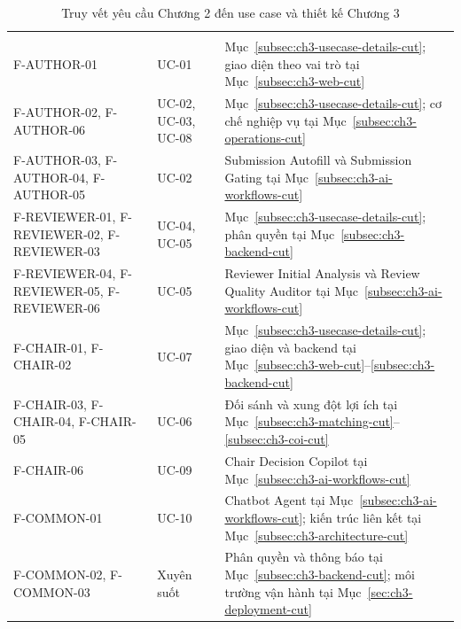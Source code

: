 \begingroup
\setlength{\tabcolsep}{2pt}
\begin{longtable}{|P{0.29\textwidth}|P{0.20\textwidth}|P{0.43\textwidth}|}
  \caption{Truy vết yêu cầu Chương 2 đến use case và thiết kế Chương 3}\label{tab:ch3-requirement-trace}\\
  \hline
   &  &  \\ \hline
  \endfirsthead
  \hline
   &  &  \\ \hline
  \endhead
  F-AUTHOR-01 & UC-01 & Mục~\ref{subsec:ch3-usecase-details-cut}; giao diện theo vai trò tại Mục~\ref{subsec:ch3-web-cut} \\ \hline
  F-AUTHOR-02, F-AUTHOR-06 & UC-02, UC-03, UC-08 & Mục~\ref{subsec:ch3-usecase-details-cut}; cơ chế nghiệp vụ tại Mục~\ref{subsec:ch3-operations-cut} \\ \hline
  F-AUTHOR-03, F-AUTHOR-04, F-AUTHOR-05 & UC-02 & Submission Autofill và Submission Gating tại Mục~\ref{subsec:ch3-ai-workflows-cut} \\ \hline
  F-REVIEWER-01, F-REVIEWER-02, F-REVIEWER-03 & UC-04, UC-05 & Mục~\ref{subsec:ch3-usecase-details-cut}; phân quyền tại Mục~\ref{subsec:ch3-backend-cut} \\ \hline
  F-REVIEWER-04, F-REVIEWER-05, F-REVIEWER-06 & UC-05 & Reviewer Initial Analysis và Review Quality Auditor tại Mục~\ref{subsec:ch3-ai-workflows-cut} \\ \hline
  F-CHAIR-01, F-CHAIR-02 & UC-07 & Mục~\ref{subsec:ch3-usecase-details-cut}; giao diện và backend tại Mục~\ref{subsec:ch3-web-cut}--\ref{subsec:ch3-backend-cut} \\ \hline
  F-CHAIR-03, F-CHAIR-04, F-CHAIR-05 & UC-06 & Đối sánh và xung đột lợi ích tại Mục~\ref{subsec:ch3-matching-cut}--\ref{subsec:ch3-coi-cut} \\ \hline
  F-CHAIR-06 & UC-09 & Chair Decision Copilot tại Mục~\ref{subsec:ch3-ai-workflows-cut} \\ \hline
  F-COMMON-01 & UC-10 & Chatbot Agent tại Mục~\ref{subsec:ch3-ai-workflows-cut}; kiến trúc liên kết tại Mục~\ref{subsec:ch3-architecture-cut} \\ \hline
  F-COMMON-02, F-COMMON-03 & Xuyên suốt & Phân quyền và thông báo tại Mục~\ref{subsec:ch3-backend-cut}; môi trường vận hành tại Mục~\ref{sec:ch3-deployment-cut} \\ \hline
\end{longtable}
\endgroup


